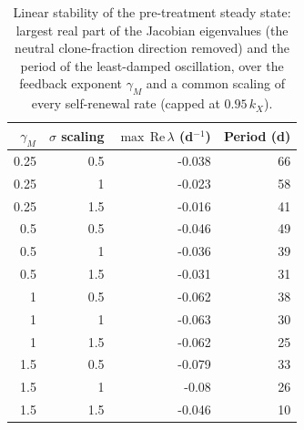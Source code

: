 \begin{table}[!htbp]
\centering
\small
\setlength{\tabcolsep}{3.5pt}
\caption{Linear stability of the pre-treatment steady state: largest real part of the Jacobian eigenvalues (the neutral clone-fraction direction removed) and the period of the least-damped oscillation, over the feedback exponent $\gamma_M$ and a common scaling of every self-renewal rate (capped at $0.95\,k_X$).}
\label{tab:stability}
\begin{tabular}{rrrr}
\toprule
$\gamma_M$ & $\sigma$ scaling & $\max\,\mathrm{Re}\,\lambda$ (d$^{-1}$) & Period (d) \\
\midrule
0.25 & 0.5 & -0.038 & 66 \\
0.25 & 1 & -0.023 & 58 \\
0.25 & 1.5 & -0.016 & 41 \\
0.5 & 0.5 & -0.046 & 49 \\
0.5 & 1 & -0.036 & 39 \\
0.5 & 1.5 & -0.031 & 31 \\
1 & 0.5 & -0.062 & 38 \\
1 & 1 & -0.063 & 30 \\
1 & 1.5 & -0.062 & 25 \\
1.5 & 0.5 & -0.079 & 33 \\
1.5 & 1 & -0.08 & 26 \\
1.5 & 1.5 & -0.046 & 10 \\
\bottomrule
\end{tabular}
\end{table}
